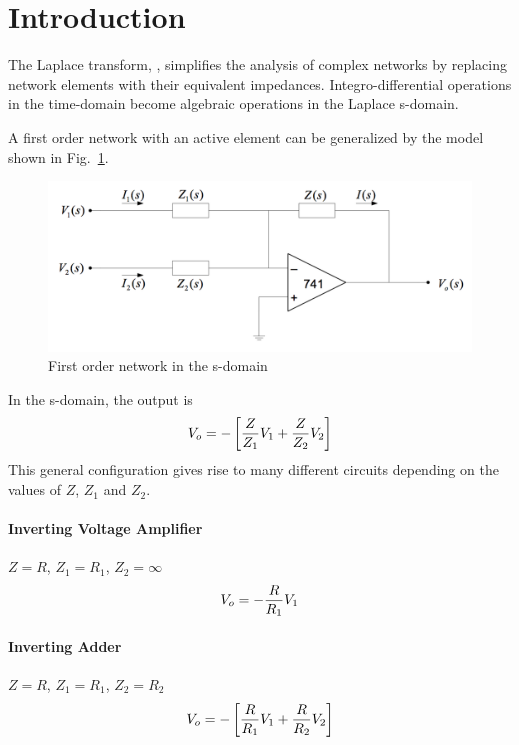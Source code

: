 \section{Introduction}\label{sec:intro}
The Laplace transform, \LT, simplifies the analysis of complex networks by replacing network elements with their equivalent impedances.
Integro-differential operations in the time-domain become algebraic operations in the Laplace s-domain.

A first order network with an active element can be generalized by the model shown in Fig.~\ref{fig:first-order-network}.

\begin{figure}[htpb]
	\centering
	\includegraphics[width=0.7\linewidth]{graphics/s-network}	
	\caption{First order network in the s-domain}
	\label{fig:first-order-network}
\end{figure}

In the s-domain, the output is
\begin{equation}\label{eqn:first-order-network}
	V_o = - \left[ {Z \over Z_1}V_1 + {Z \over Z_2}V_2 \right]
\end{equation}
This general configuration gives rise to many different circuits depending on the values of $Z$, $Z_1$ and $Z_2$.

\paragraph{Inverting Voltage Amplifier} $Z = R$, $Z_1 = R_1$, $Z_2 = \infty$
\begin{equation}\label{eqn:inverter}
	V_o = - {R \over R_1}V_1
\end{equation}

\paragraph{Inverting Adder} $Z = R$, $Z_1 = R_1$, $Z_2 = R_2$
\begin{equation}\label{eqn:adder}
	V_o = - \left[ {R \over R_1}V_1 + {R \over R_2}V_2 \right]
\end{equation}

